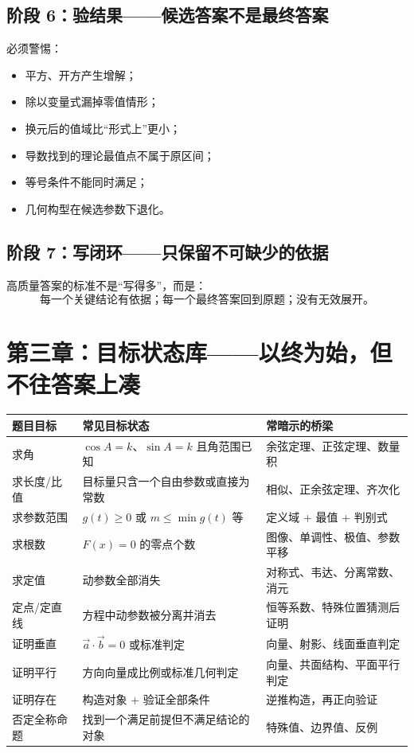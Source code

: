 \documentclass[11pt,a4paper]{ctexart}
\begin{document}
\subsection{阶段 6：验结果——候选答案不是最终答案}

必须警惕：
\begin{itemize}
  \item 平方、开方产生增解；
  \item 除以变量式漏掉零值情形；
  \item 换元后的值域比“形式上”更小；
  \item 导数找到的理论最值点不属于原区间；
  \item 等号条件不能同时满足；
  \item 几何构型在候选参数下退化。
\end{itemize}

\subsection{阶段 7：写闭环——只保留不可缺少的依据}

高质量答案的标准不是“写得多”，而是：
\[
\boxed{\text{每一个关键结论有依据；每一个最终答案回到原题；没有无效展开。}}
\]

\section{第三章：目标状态库——以终为始，但不往答案上凑}

\begin{longtable}{p{3cm}p{5.6cm}p{6.5cm}}
\toprule
\textbf{题目目标} & \textbf{常见目标状态} & \textbf{常暗示的桥梁}\\
\midrule
求角 & $\cos A=k$、$\sin A=k$ 且角范围已知 & 余弦定理、正弦定理、数量积\\ \hline
求长度/比值 & 目标量只含一个自由参数或直接为常数 & 相似、正余弦定理、齐次化\\ \hline
求参数范围 & $g(t)\ge0$ 或 $m\le \min g(t)$ 等 & 定义域 + 最值 + 判别式\\ \hline
求根数 & $F(x)=0$ 的零点个数 & 图像、单调性、极值、参数平移\\ \hline
求定值 & 动参数全部消失 & 对称式、韦达、分离常数、消元\\ \hline
定点/定直线 & 方程中动参数被分离并消去 & 恒等系数、特殊位置猜测后证明\\ \hline
证明垂直 & $\vec a\cdot\vec b=0$ 或标准判定 & 向量、射影、线面垂直判定\\ \hline
证明平行 & 方向向量成比例或标准几何判定 & 向量、共面结构、平面平行判定\\ \hline
证明存在 & 构造对象 + 验证全部条件 & 逆推构造，再正向验证\\ \hline
否定全称命题 & 找到一个满足前提但不满足结论的对象 & 特殊值、边界值、反例\\
\bottomrule
\end{longtable}
\end{document}
